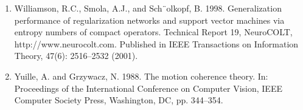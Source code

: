 \documentclass[fleqn,10pt]{olplainarticle}
\begin{document}
\begin{enumerate}
    \item Williamson, R.C., Smola, A.J., and Sch¨olkopf, B. 1998. Generalization performance of regularization networks and support vector machines via entropy numbers of compact operators. Technical Report 19, NeuroCOLT, http://www.neurocolt.com. Published in IEEE Transactions on Information Theory, 47(6): 2516–2532 (2001).

    \item Yuille, A. and Grzywacz, N. 1988. The motion coherence theory. In: Proceedings of the International Conference on Computer Vision, IEEE Computer Society Press, Washington, DC, pp. 344–354.
\end{enumerate}
\end{document}
